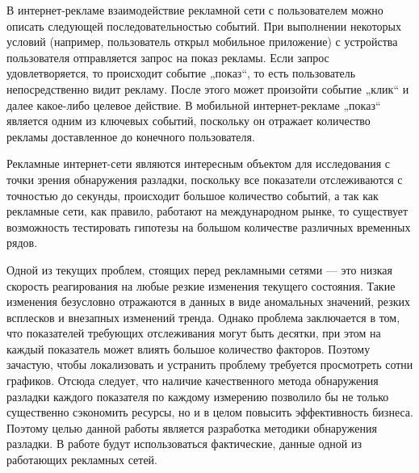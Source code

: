 \documentclass[%
12pt,
master,  %
natbib,      %
subf,        %
substylefile = spbu.rtx,
href,        %
colorlinks,  %
]{disser}
\begin{document}
В интернет-рекламе взаимодействие рекламной сети с пользователем можно описать следующей последовательностью событий. При выполнении некоторых условий (например, пользователь открыл мобильное приложение) с устройства пользователя отправляется запрос на показ рекламы. Если запрос удовлетворяется, то происходит событие „показ“, то есть пользователь непосредственно видит рекламу. После этого может произойти событие „клик“ и далее какое-либо целевое действие. В мобильной интернет-рекламе „показ“ является одним из ключевых событий, поскольку он отражает количество рекламы доставленное до конечного пользователя.

Рекламные интернет-сети являются интересным объектом для исследования с точки зрения обнаружения разладки, поскольку все показатели отслеживаются с точностью до секунды, происходит большое количество событий, а так как рекламные сети, как правило, работают на международном рынке, то существует возможность тестировать гипотезы на большом количестве различных временных рядов.

Одной из текущих проблем, стоящих перед рекламными сетями --- это низкая скорость реагирования на любые резкие изменения текущего состояния. Такие изменения безусловно отражаются в данных в виде аномальных значений, резких всплесков и внезапных изменений тренда. Однако проблема заключается в том, что показателей требующих отслеживания могут быть десятки, при этом на каждый показатель может влиять большое количество факторов. Поэтому зачастую, чтобы локализовать и устранить проблему требуется просмотреть сотни графиков. Отсюда следует, что наличие качественного метода обнаружения разладки каждого показателя по каждому измерению позволило бы не только существенно сэкономить ресурсы, но и в целом повысить эффективность бизнеса. Поэтому целью данной работы является разработка методики обнаружения разладки. В работе будут использоваться фактические, данные одной из работающих рекламных сетей.
\end{document}
